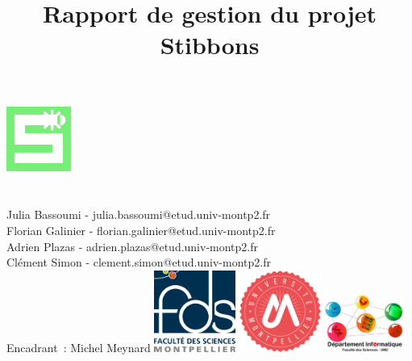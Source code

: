 \documentclass[a4paper,11pt]{report}
\begin{document}
\title{Rapport de gestion du projet Stibbons}

\makeatletter
  \begin{titlepage}
  \centering
        \includegraphics[height=0.2\textheight]{doc/gestionProjet/stibbons.pdf}\\
        \vfill
        {\LARGE \textbf{\@title}}\\
        \vspace{1cm}
		{\large \textbf{\@date}}\\
		\vspace{1cm}
		{\large Julia Bassoumi - julia.bassoumi@etud.univ-montp2.fr\\Florian Galinier - florian.galinier@etud.univ-montp2.fr\\Adrien Plazas - adrien.plazas@etud.univ-montp2.fr\\Clément Simon - clement.simon@etud.univ-montp2.fr\\}
		\vspace{1cm}
		{\large Encadrant~: Michel Meynard}
        \vfill
        \includegraphics[width=0.2\textwidth]{doc/gestionProjet/fds.png}
        \hfill
        \includegraphics[width=0.2\textwidth]{doc/gestionProjet/UM2.png}
        \hfill
        \includegraphics[width=0.2\textwidth]{doc/gestionProjet/depinfo.jpeg}
  \end{titlepage}
\makeatother

\tableofcontents
\end{document}
